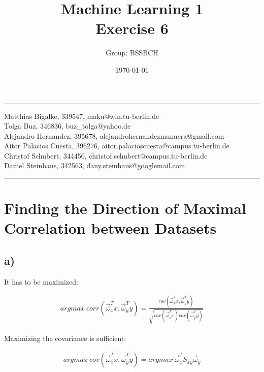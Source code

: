 \documentclass{article}
\title{Machine Learning 1 \\ Exercise 6} %
\author{Group: BSSBCH} %
\date{\today} %
\begin{document}
\maketitle %
\noindent\rule[0.5ex]{\linewidth}{1pt}
Matthias Bigalke, 339547, maku@win.tu-berlin.de \\
Tolga Buz, 346836, buz\_tolga@yahoo.de \\
Alejandro Hernandez, 395678, alejandrohernandezmunuera@gmail.com \\
Aitor Palacios Cuesta, 396276, aitor.palacioscuesta@campus.tu-berlin.de \\
Christof Schubert, 344450, christof.schubert@campus.tu-berlin.de \\
Daniel Steinhaus, 342563, dany.steinhaus@googlemail.com\\
\noindent\rule[0.5ex]{\linewidth}{1pt}


\section{Finding the Direction of Maximal Correlation between Datasets}

\subsection*{a)}

It has to be maximized:

\begin{equation}
\begin{aligned}
argmax ~ corr(\vec{\omega}_x^Tx, \vec{\omega}_y^Ty) = \frac{cov( \vec{\omega}_x^Tx, \vec{\omega}_y^Ty)}{\sqrt{var( \vec{\omega}_x^Tx) var(\vec{\omega}_y^Ty)}}
\end{aligned}
\end{equation}

Maximizing the covariance is sufficient:

\begin{equation}
\begin{aligned}
argmax ~ cov( \vec{\omega}_x^Tx, \vec{\omega}_y^Ty) = argmax ~ \vec{\omega}_x^T S_{xy} \vec{\omega}_y
\end{aligned}
\end{equation}
\end{document}
